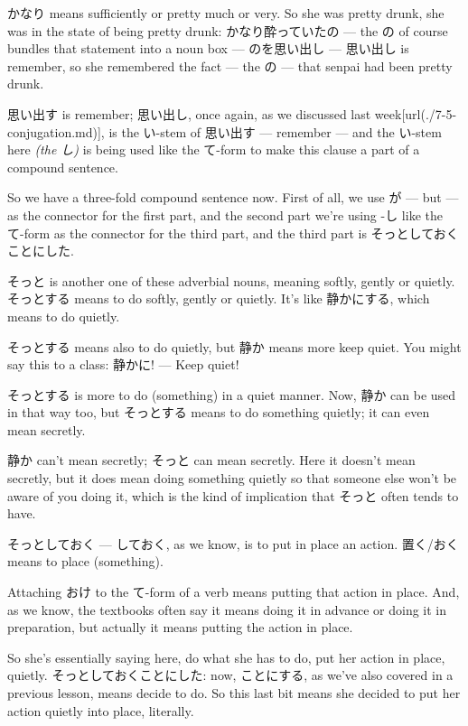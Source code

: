かなり means sufficiently or pretty much or very. So she was pretty drunk, she was in the state of being pretty drunk: かなり酔っていたの --- the の of course bundles that statement into a noun box --- のを思い出し --- 思い出し is remember, so she remembered the fact --- the の --- that senpai had been pretty drunk.

思い出す is remember; 思い出し, once again, as we discussed last week\goto{{[}7.5{]}}[url(./7-5-conjugation.md)], is the い-stem of 思い出す --- remember --- and the い-stem here {\em (the し)} is being used like the て-form to make this clause a part of a compound sentence.

{}

So we have a three-fold compound sentence now. First of all, we use が --- but --- as the connector for the first part, and the second part we're using -し like the て-form as the connector for the third part, and the third part is そっとしておくことにした.

{}

そっと is another one of these adverbial nouns, meaning softly, gently or quietly. そっとする means to do softly, gently or quietly. It's like 静かにする, which means to do quietly.

そっとする means also to do quietly, but 静か means more keep quiet. You might say this to a class: 静かに! --- Keep quiet!

そっとする is more to do (something) in a quiet manner. Now, 静か can be used in that way too, but そっとする means to do something quietly; it can even mean secretly.

静か can't mean secretly; そっと can mean secretly. Here it doesn't mean secretly, but it does mean doing something quietly so that someone else won't be aware of you doing it, which is the kind of implication that そっと often tends to have.

そっとしておく --- しておく, as we know, is to put in place an action. 置く/おく means to place (something).

{}

Attaching おけ to the て-form of a verb means putting that action in place. And, as we know, the textbooks often say it means doing it in advance or doing it in preparation, but actually it means putting the action in place.

So she's essentially saying here, do what she has to do, put her action in place, quietly. そっとしておくことにした: now, ことにする, as we've also covered in a previous lesson, means decide to do. So this last bit means she decided to put her action quietly into place, literally.

